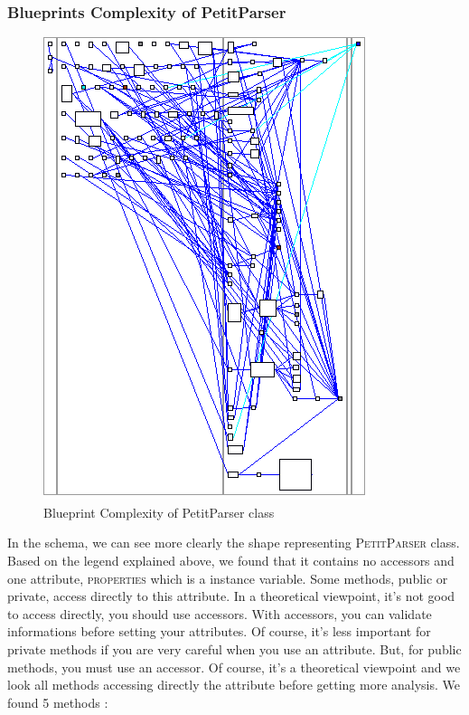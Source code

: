 \subsubsection{Blueprints Complexity of PetitParser}
\begin{figure}[ht]
\centering
\label{blueprint_pparser}
\includegraphics[scale=0.35]{blueprint_pparser.png}
\caption{Blueprint Complexity of PetitParser class}
\end{figure}
In the schema, we can see more clearly the shape representing \textsc{PetitParser} class.\\
Based on the legend explained above, we found that it contains no accessors and one attribute, \textsc{properties} which is a instance variable.  Some methods, public or private, access directly to this attribute.  In a theoretical viewpoint, it's not good to access directly, you should use accessors.  With accessors, you can validate informations before setting your attributes.  Of course, it's less important for private methods if you are very careful when you use an attribute.  But, for public methods, you must use an accessor.
Of course, it's a theoretical viewpoint and we look all methods accessing directly the attribute before getting more analysis.  We found 5 methods : 
